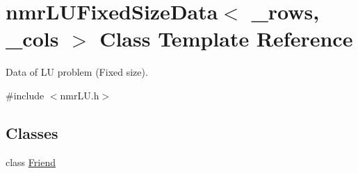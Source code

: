 \hypertarget{classnmr_l_u_fixed_size_data}{}\section{nmr\+L\+U\+Fixed\+Size\+Data$<$ \+\_\+rows, \+\_\+cols $>$ Class Template Reference}
\label{classnmr_l_u_fixed_size_data}


Data of L\+U problem (Fixed size).  




{\ttfamily \#include $<$nmr\+L\+U.\+h$>$}

\subsection*{Classes}
\begin{DoxyCompactItemize}
\item 
class \hyperlink{classnmr_l_u_fixed_size_data_1_1_friend}{Friend}
\end{DoxyCompactItemize}
